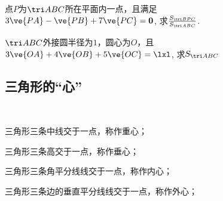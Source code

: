 \begin{example}
    点\(P\)为\(\tri ABC\)所在平面内一点，且满足\(3\ve{PA}-\ve{PB}+7\ve{PC}=\boldsymbol{0}\),
    求\(\frac{S_{\tri BPC}}{S_{\tri ABC}}\).
\end{example}
\begin{example}
    \(\tri ABC\)外接圆半径为\(1\)，圆心为\(O\)，且\(3\ve{OA}+4\ve{OB}+5\ve{OC}=\lxl\), 求\(S_{\tri ABC}\)
\end{example}
\clearpage
\subsection{三角形的“心”}

\begin{definition}[三角形的“心”]
    \   

    三角形三条中线交于一点，称作重心；

    三角形三条高交于一点，称作垂心；

    三角形三条角平分线线交于一点，称作内心；

    三角形三条边的垂直平分线线交于一点，称作外心；
\end{definition}

